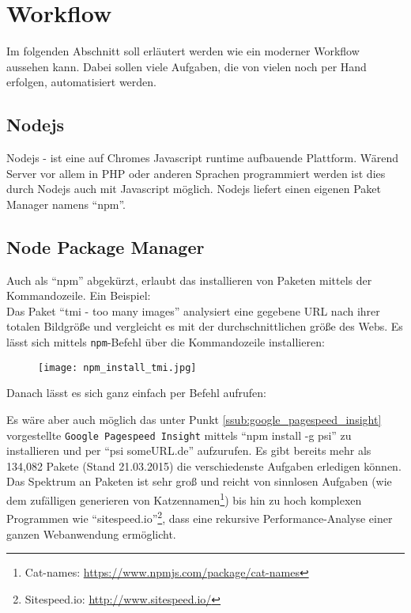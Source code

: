 \section{Workflow} %
\label{sec:workflow}
	Im folgenden Abschnitt soll erläutert werden wie ein moderner Workflow aussehen kann. Dabei sollen viele Aufgaben, die von vielen noch per Hand erfolgen, automatisiert werden.\\

	\subsection{Nodejs} %
	\label{sub:nodejs}
		Nodejs - ist eine auf Chromes Javascript runtime aufbauende Plattform. Wärend Server vor allem in PHP oder anderen Sprachen programmiert werden ist dies durch Nodejs auch mit Javascript möglich. Nodejs liefert einen eigenen Paket Manager namens "`npm"'.

	\subsection{Node Package Manager} %
	\label{sub:node_package_manager}
		Auch als "`npm"' abgekürzt, erlaubt das installieren von Paketen mittels der Kommandozeile. Ein Beispiel:\\
		Das Paket "`tmi - too many images"' analysiert eine gegebene URL nach ihrer totalen Bildgröße und vergleicht es mit der durchschnittlichen größe des Webs. Es lässt sich mittels \texttt{npm}-Befehl über die Kommandozeile installieren:
		\begin{figure}[htbp]
			\begin{center}
				\texttt{[image: npm\_install\_tmi.jpg]}
				\label{fig:npm_install_tmi}
			\end{center}
		\end{figure}
		Danach lässt es sich ganz einfach per Befehl aufrufen:

		Es wäre aber auch möglich das unter Punkt \ref{ssub:google_pagespeed_insight} vorgestellte \texttt{Google Pagespeed Insight} mittels "`npm install -g psi"' zu installieren und per "`psi someURL.de"' aufzurufen. Es gibt bereits mehr als 134,082 Pakete (Stand 21.03.2015) die verschiedenste Aufgaben erledigen können. Das Spektrum an Paketen ist sehr groß und reicht von sinnlosen Aufgaben (wie dem zufälligen generieren von Katzennamen\footnote{Cat-names: \url{https://www.npmjs.com/package/cat-names}}) bis hin zu hoch komplexen Programmen wie "`sitespeed.io"'\footnote{Sitespeed.io: \url{http://www.sitespeed.io/}}, dass eine rekursive Performance-Analyse einer ganzen Webanwendung ermöglicht.\\

